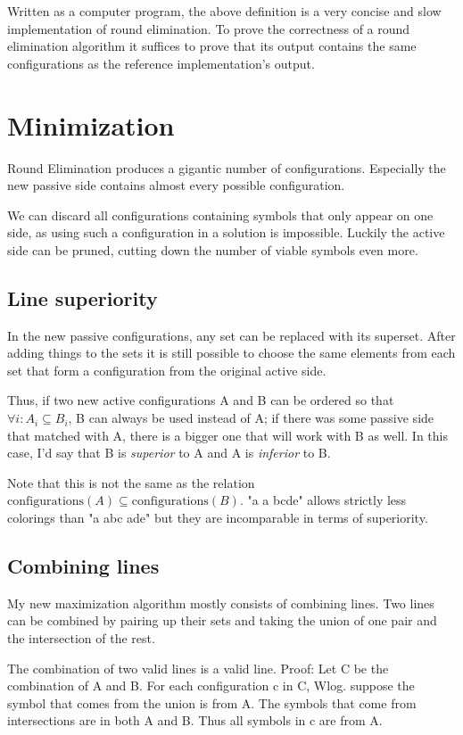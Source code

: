 \documentclass[english, 12pt, a4paper, sci, utf8, a-1b, online]{aaltothesis}
\begin{document}
Written as a computer program, the above definition is a very concise and slow implementation of round elimination. To prove the correctness of a round elimination algorithm it suffices to prove that its output contains the same configurations as the reference implementation's output.

\section{Minimization}

Round Elimination produces a gigantic number of configurations. Especially the new passive side contains almost every possible configuration.

We can discard all configurations containing symbols that only appear on one side, as using such a configuration in a solution is impossible. Luckily the active side can be pruned, cutting down the number of viable symbols even more. 

\subsection{Line superiority}

In the new passive configurations, any set can be replaced with its superset. After adding things to the sets it is still possible to choose the same elements from each set that form a configuration from the original active side.

Thus, if two new active configurations A and B can be ordered so that $\forall i : A_i \subseteq B_i$, B can always be used instead of A; if there was some passive side that matched with A, there is a bigger one that will work with B as well. In this case, I'd say that B is \emph{superior} to A and A is \emph{inferior} to B.

Note that this is not the same as the relation $\text{configurations}(A) \subseteq \text{configurations}(B)$. "a a bcde" allows strictly less colorings than "a abc ade" but they are incomparable in terms of superiority.

\subsection{Combining lines}

My new maximization algorithm mostly consists of combining lines. Two lines can be combined by pairing up their sets and taking the union of one pair and the intersection of the rest.

The combination of two valid lines is a valid line. Proof: Let C be the combination of A and B. For each configuration c in C, Wlog. suppose the symbol that comes from the union is from A. The symbols that come from intersections are in both A and B. Thus all symbols in c are from A.
\end{document}
